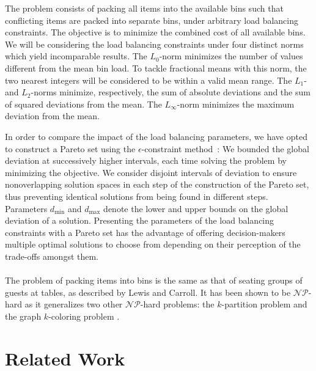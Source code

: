 \documentclass{llncs}
\begin{document}
The problem consists of packing all items into the available bins such that conflicting items are packed into separate bins, under arbitrary load balancing constraints. The objective is to minimize the combined cost of all available bins. We will be considering the load balancing constraints under four distinct norms which yield incomparable results. The $L_{0}$-norm minimizes the number of values different from the mean bin load. To tackle fractional means with this norm, the two nearest integers will be considered to be within a valid mean range. The $L_{1}$- and $L_{2}$-norms minimize, respectively, the sum of absolute deviations and the sum of squared deviations from the mean. The $L_{\infty}$-norm minimizes the maximum deviation from the mean.

In order to compare the impact of the load balancing parameters, we have opted to construct a Pareto set using the $\epsilon$-constraint method~\cite{Miettinen1998}: We bounded the global deviation at successively higher intervals, each time solving the problem by minimizing the objective. We consider disjoint intervals of deviation to ensure nonoverlapping solution spaces in each step of the construction of the Pareto set, thus preventing identical solutions from being found in different steps. Parameters $d_{\min}$ and $d_{\max}$ denote the lower and upper bounds on the global deviation of a solution. Presenting the parameters of the load balancing constraints with a Pareto set has the advantage of offering decision-makers multiple optimal solutions to choose from depending on their perception of the trade-offs amongst them.

\paragraph{}The problem of packing items into bins is the same as that of seating groups of guests at tables, as described by Lewis and Carroll. It has been shown to be $\mathcal{NP}$-hard as it generalizes two other $\mathcal{NP}$-hard problems: the $k$-partition problem and the graph $k$-coloring problem \cite{Lewis2016}.




\section{Related Work}
\label{sec:related_work}
\end{document}
